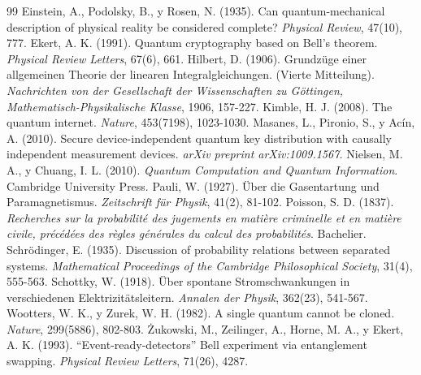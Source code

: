 \documentclass[11pt,a4paper,spanish]{book}
\begin{document}
\begin{thebibliography}{99}
 Einstein, A., Podolsky, B., y Rosen, N. (1935). Can quantum-mechanical description of physical reality be considered complete? \emph{Physical Review}, 47(10), 777.
 Ekert, A. K. (1991). Quantum cryptography based on Bell’s theorem. \emph{Physical Review Letters}, 67(6), 661.
 Hilbert, D. (1906). Grundzüge einer allgemeinen Theorie der linearen Integralgleichungen. (Vierte Mitteilung). \emph{Nachrichten von der Gesellschaft der Wissenschaften zu Göttingen, Mathematisch-Physikalische Klasse}, 1906, 157-227.
 Kimble, H. J. (2008). The quantum internet. \emph{Nature}, 453(7198), 1023-1030.
 Masanes, L., Pironio, S., y Acín, A. (2010). Secure device-independent quantum key distribution with causally independent measurement devices. \emph{arXiv preprint arXiv:1009.1567.}
 Nielsen, M. A., y Chuang, I. L. (2010). \emph{Quantum Computation and Quantum Information}. Cambridge University Press.
 Pauli, W. (1927). Über die Gasentartung und Paramagnetismus. \emph{Zeitschrift für Physik}, 41(2), 81-102.
 Poisson, S. D. (1837). \emph{Recherches sur la probabilité des jugements en matière criminelle et en matière civile, précédées des règles générales du calcul des probabilités}. Bachelier.
 Schrödinger, E. (1935). Discussion of probability relations between separated systems. \emph{Mathematical Proceedings of the Cambridge Philosophical Society}, 31(4), 555-563.
 Schottky, W. (1918). Über spontane Stromschwankungen in verschiedenen Elektrizitätsleitern. \emph{Annalen der Physik}, 362(23), 541-567.
 Wootters, W. K., y Zurek, W. H. (1982). A single quantum cannot be cloned. \emph{Nature}, 299(5886), 802-803.
 Żukowski, M., Zeilinger, A., Horne, M. A., y Ekert, A. K. (1993). ``Event-ready-detectors'' Bell experiment via entanglement swapping. \emph{Physical Review Letters}, 71(26), 4287.
\end{thebibliography}

% 
%
\end{document}
